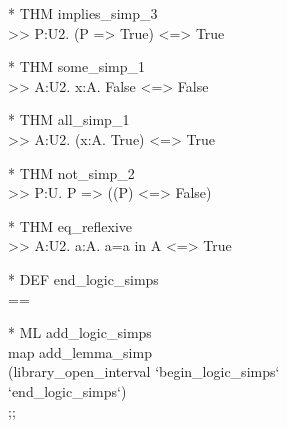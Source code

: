 \begin{prl*}
\>* THM implies\_simp\_3\\
\>  >> \mforall{}P:U2. (P => True) <=> True
\end{prl*}

\begin{prl*}
\>* THM some\_simp\_1\\
\>  >> \mforall{}A:U2. \mexists{}x:A. False <=> False
\end{prl*}

\begin{prl*}
\>* THM all\_simp\_1\\
\>  >> \mforall{}A:U2. (\mforall{}x:A. True) <=> True
\end{prl*}

\begin{prl*}
\>* THM not\_simp\_2\\
\>  >> \mforall{}P:U. P => (\mneg{}(P) <=> False)
\end{prl*}

\begin{prl*}
\>* THM eq\_reflexive\\
\>  >> \mforall{}A:U2. \mforall{}a:A. a=a in A <=> True
\end{prl*}

\begin{prl*}
\>* DEF end\_logic\_simps\\
\>  ==
\end{prl*}

\begin{prl*}
\>* ML add\_logic\_simps\\
\>  map add\_lemma\_simp\\
\>  (library\_open\_interval `begin\_logic\_simps`\\
\>    `end\_logic\_simps`)\\
\>  ;;
\end{prl*}

